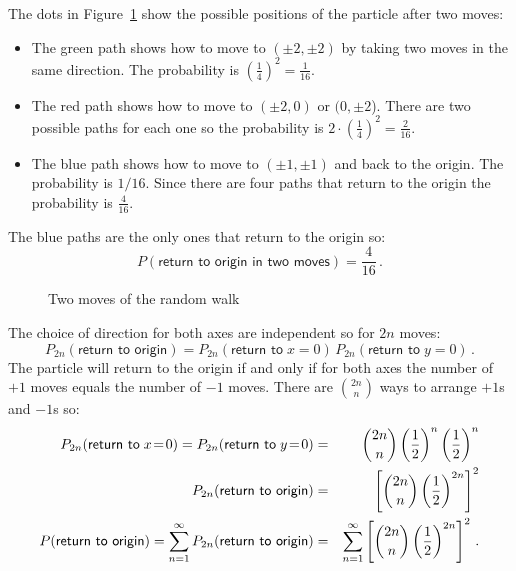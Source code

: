 The dots in Figure~\ref{f.two-moves} show the possible positions of the particle after two moves:
\begin{itemize}
\item The green path shows how to move to $(\pm 2, \pm 2)$ by taking two moves in the same direction. The probability is $\left(\frac{1}{4}\right)^2= \frac{1}{16}$.
\item The red path shows how to move to $(\pm 2,0)$ or $(0,\pm 2$). There are two possible paths for each one so the probability is $2\cdot\left(\frac{1}{4}\right)^2= \frac{2}{16}$.
\item The blue path shows how to move to $(\pm 1,\pm 1)$ and back to the origin. The probability is $1/16$. Since there are four paths that return to the origin the probability is $\frac{4}{16}$.
\end{itemize}
The blue paths are the only ones that return to the origin so:
\[
P(\textsf{return to origin in two moves})=\frac{4}{16}\,.
\]

\begin{figure}[tb]
\begin{center}
\end{center}
\caption{Two moves of the random walk}\label{f.two-moves}
\end{figure}

 The choice of direction for both axes are independent so for $2n$ moves:
\begin{equation}\label{eq.2d-1}
P_{2n}(\textsf{return to origin}) =
P_{2n}(\textsf{return to}\;x\!=\!0)\,P_{2n}(\textsf{return to}\;y\!=\!0)\,.
\end{equation}
The particle will return to the origin if and only if for both axes the number of $+1$ moves equals the number of $-1$ moves. There are ${2n \choose n}$ ways to arrange $+1$s and $-1$s so:
{
\addtolength{\arraycolsep}{-3pt}
\begin{eqnarray}
\label{eq.return-to-origin1}
P_{2n}(\textsf{return to}\;x\!=\!0) =P_{2n}(\textsf{return to}\;y\!=\!0)&=&
\displaystyle{2n \choose n}\left(\displaystyle\frac{1}{2}\right)^n\left(\displaystyle\frac{1}{2}\right)^{n}\\
P_{2n}(\textsf{return to origin}) &=&
\left[\displaystyle{2n \choose n}\left(\displaystyle\frac{1}{2}\right)^{2n}\right]^2\\
P(\textsf{return to origin}) =
\sum_{n=1}^{\infty}P_{2n}(\textsf{return to origin}) &=&
\sum_{n=1}^{\infty}\left[\displaystyle{2n \choose n}\left(\displaystyle\frac{1}{2}\right)^{2n}\right]^2\,.\label{eq.return-to-origin2}
\end{eqnarray}
}

